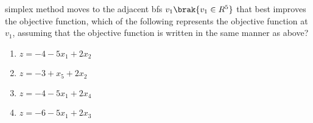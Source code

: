 simplex method moves to the adjacent bfs $v_{1} \brak{v_{1} \in R^{5}}$ that best improves the
objective function, which of the following represents the objective function at $v_{1}$,
assuming that the objective function is written in the same manner as above?\\
\begin{enumerate}
    \item$z=-4-5x_{1}+2x_{2}$\\
    \item$z=-3+x_{5}+2x_{2}$\\
    \item$z=-4-5x_{1}+2x_{4}$\\
    \item$z=-6-5x_{1}+2x_{3}$\\
\end{enumerate}
 








